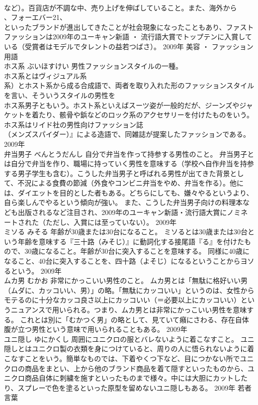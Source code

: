 \documentclass[8pt]{extreport}
\begin{document}
\begin{CJK}{UTF8}{min}
\\	など）。百貨店が不調な中、売り上げを伸ばしていること。また、海外から
\\	、フォーエバー21、
\\	といったブランドが進出してきたことが社会現象になったこともあり、ファストファッションは2009年のユーキャン新語 ・ 流行語大賞でトップテンに入賞している（受賞者はモデルでタレントの益若つばさ）。	2009年	美容 ・ ファッション用語	
\\	ホス系	ぶいほすけい	男性ファッションスタイルの一種。	
\\	ホス系とはヴィジュアル系
\\	系）とホスト系から成る合成語で、両者を取り入れた形のファッションスタイルを言い、そういうスタイルの男性を
\\	ホス系男子ともいう。ホスト系といえばスーツ姿が一般的だが、ジーンズやジャケットを着たり、骸骨や鋲などのロック系のアクセサリーを付けたものをいう。
\\	ホス系はリイド社の男性向けファッション誌
\\	（メンズスパイダー）』による造語で、同雑誌が提案したファッションである。	2009年	
\\	弁当男子	べんとうだんし	自分で弁当を作って持参する男性のこと。	弁当男子とは自分で弁当を作り、職場に持っていく男性を意味する（学校へ自作弁当を持参する男子学生も含む）。こうした弁当男子と呼ばれる男性が出てきた背景として、不況による食費の節減（外食やコンビニ弁当をやめ、弁当を作る）。他には、ダイエットを目的とした者もある。どちらにしても、嫌々やるというより、自ら楽しんでやるという傾向が強い。 また、こうした弁当男子向けの料理本なども出版されるなど注目され、2009年のユーキャン新語・流行語大賞にノミネートされた（ただし、入賞には至っていない）。	2009年	
\\	ミソる	みそる	年齢が30歳または30台になること。	ミソるとは30歳または30台という年齢を意味する『三十路（みそじ）』に動詞化する接尾語『る』を付けたもので、30歳になること。年齢が30台に突入することを意味する。 同様に40歳になること、40台に突入することを、四十路（よそじ）になるということからヨソるという。	2009年	
\\	ムカ男	むかお	非常にかっこいい男性のこと。	ムカ男とは「無駄に格好いい男（ムダに、カッコいい、男）」の略。「無駄にカッコいい」というのは、女性からモテるのに十分なカッコ良さ以上にカッコいい（＝必要以上にカッコいい）というニュアンスで用いられる。つまり、ムカ男とは非常にかっこいい男性を意味する。 これとは別に「むかつく男」の略として、見ていて癪にさわる、存在自体腹が立つ男性という意味で用いられることもある。	2009年	
\\	ユニ隠し	ゆにかくし	周囲にユニクロの服とバレないように着こなすこと。	ユニ隠しとはユニクロ製の衣類を身につけていると、周りの人に悟られないように着こなすことをいう。簡単なものでは、下着やくつ下など、目につかない所でユニクロの商品をまとい、上から他のブランド商品を着て隠すといったものから、ユニクロ商品自体に刺繍を施すといったものまで様々。中には大胆にカットしたり、スプレーで色を塗るといった原型を留めないユニ隠しもある。	2009年	若者言葉	

\end{CJK}
\end{document}
